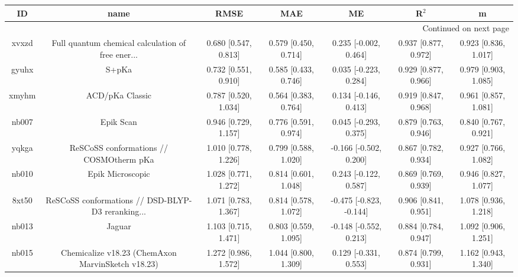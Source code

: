 \documentclass{article}
\begin{document}
\begin{center}
\begin{longtable}{|ccccccc|}
\toprule
    ID &                                               name &                  RMSE &                   MAE &                       ME &                 R$^2$ &                      m \\
\midrule
\endhead
\midrule
\multicolumn{7}{r}{{Continued on next page}} \\
\midrule
\endfoot

\bottomrule
\endlastfoot
 xvxzd &  Full quantum chemical calculation of free ener... &  0.680 [0.547, 0.813] &  0.579 [0.450, 0.714] &    0.235 [-0.002, 0.464] &  0.937 [0.877, 0.972] &   0.923 [0.836, 1.017] \\
 gyuhx &                                              S+pKa &  0.732 [0.551, 0.910] &  0.585 [0.433, 0.746] &    0.035 [-0.223, 0.284] &  0.929 [0.877, 0.966] &   0.979 [0.903, 1.085] \\
 xmyhm &                                    ACD/pKa Classic &  0.787 [0.520, 1.034] &  0.564 [0.383, 0.764] &    0.134 [-0.146, 0.413] &  0.919 [0.847, 0.968] &   0.961 [0.857, 1.081] \\
 nb007 &                                          Epik Scan &  0.946 [0.729, 1.157] &  0.776 [0.591, 0.974] &    0.045 [-0.293, 0.375] &  0.879 [0.763, 0.946] &   0.840 [0.767, 0.921] \\
 yqkga &            ReSCoSS conformations // COSMOtherm pKa &  1.010 [0.778, 1.226] &  0.799 [0.588, 1.020] &   -0.166 [-0.502, 0.200] &  0.867 [0.782, 0.934] &   0.927 [0.766, 1.082] \\
 nb010 &                                   Epik Microscopic &  1.028 [0.771, 1.272] &  0.814 [0.601, 1.048] &    0.243 [-0.122, 0.587] &  0.869 [0.769, 0.939] &   0.946 [0.827, 1.077] \\
 8xt50 &  ReSCoSS conformations // DSD-BLYP-D3 reranking... &  1.071 [0.783, 1.367] &  0.814 [0.578, 1.072] &  -0.475 [-0.823, -0.144] &  0.906 [0.841, 0.951] &   1.078 [0.936, 1.218] \\
 nb013 &                                             Jaguar &  1.103 [0.715, 1.471] &  0.803 [0.559, 1.095] &   -0.148 [-0.552, 0.213] &  0.884 [0.784, 0.947] &   1.092 [0.906, 1.251] \\
 nb015 &  Chemicalize v18.23 (ChemAxon MarvinSketch v18.23) &  1.272 [0.986, 1.572] &  1.044 [0.800, 1.309] &    0.129 [-0.331, 0.553] &  0.874 [0.799, 0.931] &   1.162 [0.943, 1.340] \\

\end{longtable}
\end{center}
\end{document}
